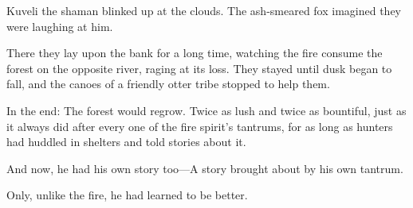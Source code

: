 Kuveli the shaman blinked up at the clouds. The ash-smeared fox imagined they were laughing at him.

There they lay upon the bank for a long time, watching the fire consume the forest on the opposite river, raging at its loss. They stayed until dusk began to fall, and the canoes of a friendly otter tribe stopped to help them.

In the end: The forest would regrow. Twice as lush and twice as bountiful, just as it always did after every one of the fire spirit's tantrums, for as long as hunters had huddled in shelters and told stories about it.

And now, he had his own story too---A story brought about by his own tantrum.

Only, unlike the fire, he had learned to be better.

